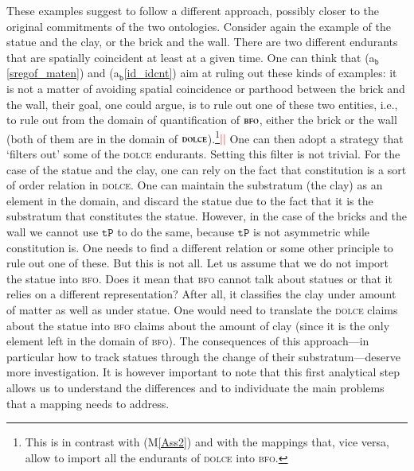 \documentclass[ao]{iosart2x}
\newcommand{\nb}[1]{\textcolor{red}{$|$}\marginpar{\hspace*{-0cm}\parbox{20mm}{\scriptsize\raggedright\textcolor{red}{#1}}}}
\newcommand{\bfoAxLabel}{\textrm{a$_\texttt{b}$}}
\newcommand{\refbfoax}[1]{({\bfoAxLabel}\ref{#1})}
\newcommand{\pr}[1]{\mathtt{#1}}
\newcommand{\dolce}{{\textsc{dolce}}}
\newcommand{\bfo}{{\textsc{bfo}}}
\newcommand {\TPd} {\ensuremath{\pr{tP}}}
\begin{document}
These examples suggest to follow a different approach, possibly closer to the original commitments of the two ontologies. Consider again the example of the statue and the clay, or the brick and the wall. There are two different endurants that are spatially coincident at least at a given time. One can think that \refbfoax{sregof_maten} and \refbfoax{id_idcnt} aim at ruling out these kinds of examples: it is not a matter of avoiding spatial coincidence or parthood between the brick and the wall, their goal, one could argue, is to rule out one of these two entities, i.e., to rule out from the domain  of quantification of $\bfo$, either the brick or the wall (both of them are in the domain of $\dolce$).\footnote{This is in contrast with (M\ref{Ass2}) and with the mappings that, vice versa, allow to import all the endurants of {\dolce} into {\bfo}.}\nb{SB: il testo della nota mi confonde}\nb{CM: provato a cambiare la fine della frase prima della nota} One can then adopt a strategy that `filters out' some of the {\dolce} endurants. Setting this filter is not trivial. For the case of the statue and the clay, one can rely on the fact that constitution is a sort of order relation in {\dolce}. One can maintain the substratum (the clay) as an element in the domain, and discard the statue due to the fact that it is the substratum that constitutes the statue. However, in the case of the bricks and the wall we cannot use $\TPd$ to do the same, because $\TPd$ is not asymmetric while constitution is.
One needs to find a different relation or some other principle to rule out one of these. But this is not all. Let us assume that we do not import the statue into {\bfo}. Does it mean that {\bfo} cannot talk about statues or that it relies on a different representation? After all, it classifies the clay under amount of matter as well as under statue. One would need to translate the {\dolce} claims about the statue into {\bfo} claims about the amount of clay %
(since it is the only element left in the domain of {\bfo}). The consequences of this approach---in particular how to track statues through the change of their substratum---deserve more investigation.  It is however important to note that this first analytical step allows us to understand the differences and to individuate the main problems that a mapping needs to address.%
\end{document}
